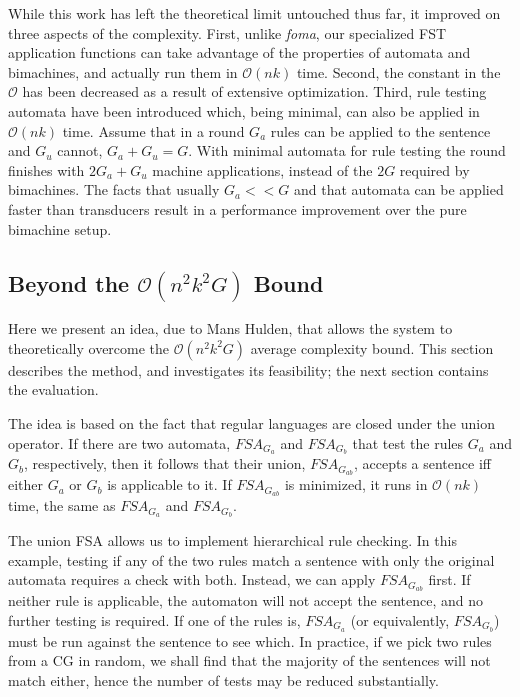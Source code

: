 \documentclass[11pt]{article}
\begin{document}
While this work has left the theoretical limit untouched thus far, it improved
on three aspects of the complexity.
First, unlike \emph{foma}, our specialized FST application functions can take
advantage of the properties of automata and bimachines, and actually run them
in $\mathcal{O}(nk)$ time.
Second, the constant in the $\mathcal{O}$ has been decreased as a result of
extensive optimization.
Third, rule testing automata have been introduced which, being minimal,
can also be applied in $\mathcal{O}(nk)$ time. Assume that in a round $G_a$
rules can be applied to the sentence and $G_u$ cannot, $G_a + G_u = G$. With
minimal automata for rule testing the round finishes with $2G_a + G_u$ machine
applications, instead of the $2G$ required by bimachines. The facts that usually
$G_a << G$ and that automata can be applied faster than transducers result in a
performance improvement over the pure bimachine setup.


\subsection{Beyond the $\mathcal{O}(n^2k^2G)$ Bound}
\label{sec:complex_idea}

Here we present an idea, due to Mans Hulden, that allows the system to
theoretically overcome the $\mathcal{O}(n^2k^2G)$ average complexity bound.
This section describes the method, and investigates its feasibility; the
next section contains the evaluation.

The idea is based on the fact that regular languages are closed under the union
operator. If there are two automata, $FSA_{G_a}$ and $FSA_{G_b}$ that test the
rules $G_a$ and $G_b$, respectively, then it follows that their union,
$FSA_{G_{ab}}$, accepts a sentence iff either $G_a$ or $G_b$ is applicable to it.
If $FSA_{G_{ab}}$ is minimized, it runs in $\mathcal{O}(nk)$ time, the same as
$FSA_{G_a}$ and $FSA_{G_b}$.

The union FSA allows us to implement hierarchical rule checking. In this example,
testing if any of the two rules match a sentence with only the original
automata requires a check with both. Instead, we can apply $FSA_{G_{ab}}$ first.
If neither rule is applicable, the automaton will not accept the sentence, and
no further testing is required. If one of the rules is, $FSA_{G_a}$ (or
equivalently, $FSA_{G_b}$) must be run against the sentence to see which. In
practice, if we pick two rules from a CG in random, we shall find that the
majority of the sentences will not match either, hence the number of tests may
be reduced substantially.
\end{document}
